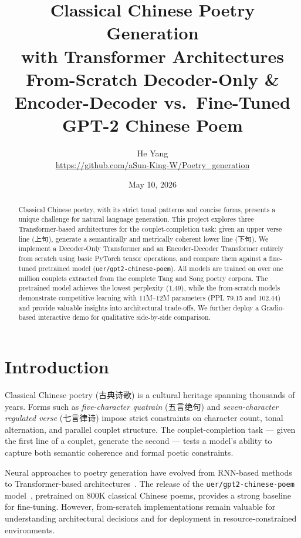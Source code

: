\documentclass[11pt,a4paper]{article}
\title{Classical Chinese Poetry Generation \\ with Transformer Architectures
    \\[0.5\baselineskip]
    \large From-Scratch Decoder-Only \& Encoder-Decoder vs.\
    Fine-Tuned GPT-2 Chinese Poem}
\author{He Yang \\[2pt] 
    \small\url{https://github.com/aSun-King-W/Poetry_generation}}
\date{May 10, 2026}
\begin{document}
\maketitle
\thispagestyle{empty}

\begin{abstract}
Classical Chinese poetry, with its strict tonal patterns and concise forms,
presents a unique challenge for natural language generation.
This project explores three Transformer-based architectures for the
couplet-completion task: given an upper verse line (上句), generate a
semantically and metrically coherent lower line (下句).
We implement a Decoder-Only Transformer and an Encoder-Decoder Transformer
entirely from scratch using basic PyTorch tensor operations, and compare them
against a fine-tuned pretrained model (\texttt{uer/gpt2-chinese-poem}).
All models are trained on over one million couplets extracted from the complete
Tang and Song poetry corpora.
The pretrained model achieves the lowest perplexity (1.49), while the
from-scratch models demonstrate competitive learning with 11M--12M parameters
(PPL 79.15 and 102.44) and provide valuable insights into architectural
trade-offs.
We further deploy a Gradio-based interactive demo for qualitative side-by-side
comparison.
\end{abstract}

\section{Introduction}
\label{sec:intro}

Classical Chinese poetry (古典诗歌) is a cultural heritage spanning thousands of
years. Forms such as \emph{five-character quatrain} (五言绝句) and
\emph{seven-character regulated verse} (七言律诗) impose strict constraints on
character count, tonal alternation, and parallel couplet structure.
The couplet-completion task --- given the first line of a couplet, generate the
second --- tests a model's ability to capture both semantic coherence and formal
poetic constraints.

Neural approaches to poetry generation have evolved from RNN-based
methods~\cite{zhang2017chinese, yi2017generating} to Transformer-based
architectures~\cite{vaswani2017attention}.
The release of the \texttt{uer/gpt2-chinese-poem} model~\cite{zhao2019uer},
pretrained on 800K classical Chinese poems, provides a strong baseline for
fine-tuning.
However, from-scratch implementations remain valuable for understanding
architectural decisions and for deployment in resource-constrained environments.
\end{document}
